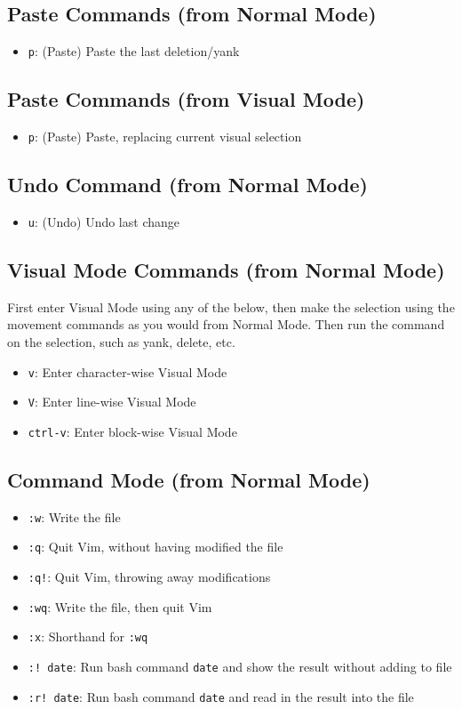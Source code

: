 \documentclass[11pt]{article}
\begin{document}
\subsection{Paste Commands (from Normal Mode)}
\label{sec:org15c49b4}
\begin{itemize}
\item \texttt{p}: (Paste) Paste the last deletion/yank
\end{itemize}
\subsection{Paste Commands (from Visual Mode)}
\label{sec:orgc88ae74}
\begin{itemize}
\item \texttt{p}: (Paste) Paste, replacing current visual selection
\end{itemize}
\subsection{Undo Command (from Normal Mode)}
\label{sec:orgbbcc076}
\begin{itemize}
\item \texttt{u}: (Undo) Undo last change
\end{itemize}
\subsection{Visual Mode Commands (from Normal Mode)}
\label{sec:orgb52848e}
First enter Visual Mode using any of the below, then make the selection using
the movement commands as you would from Normal Mode. Then run the command on the
selection, such as yank, delete, etc.

\begin{itemize}
\item \texttt{v}: Enter character-wise Visual Mode
\item \texttt{V}: Enter line-wise Visual Mode
\item \texttt{ctrl-v}: Enter block-wise Visual Mode
\end{itemize}
\subsection{Command Mode (from Normal Mode)}
\label{sec:org504d1cd}
\begin{itemize}
\item \texttt{:w}: Write the file
\item \texttt{:q}: Quit Vim, without having modified the file
\item \texttt{:q!}: Quit Vim, throwing away modifications
\item \texttt{:wq}: Write the file, then quit Vim
\item \texttt{:x}: Shorthand for \texttt{:wq}
\item \texttt{:! date}: Run bash command \texttt{date} and show the result without adding to file
\item \texttt{:r! date}: Run bash command \texttt{date} and read in the result into the file
\end{itemize}
\end{document}
